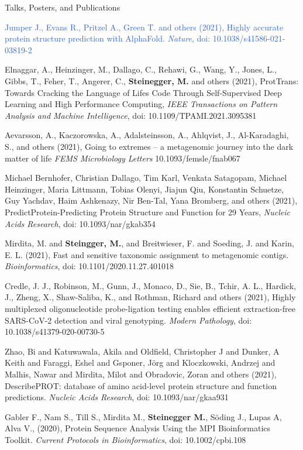 \documentclass{resume} %
\begin{document}
\begin{rSection}{Talks, Posters, and Publications}
\begin{thebibliography}{10}
\textcolor{highlight}{
Jumper J., Evans R., Pritzel A., Green T. and others (2021), 
Highly accurate protein structure prediction with AlphaFold. {\em Nature}, doi: 10.1038/s41586-021-03819-2
}

Elnaggar, A., Heinzinger, M., Dallago, C., Rehawi, G., Wang, Y., Jones, L., Gibbs, T., Feher, T., Angerer, C., {\bf Steinegger, M.} and others (2021), 
ProtTrans: Towards Cracking the Language of Lifes Code Through Self-Supervised Deep Learning and High Performance Computing, {\em IEEE Transactions on Pattern Analysis and Machine Intelligence}, doi: 10.1109/TPAMI.2021.3095381

Aevarsson, A., Kaczorowska, A., Adalsteinsson, A., Ahlqvist, J., Al-Karadaghi, S., and others (2021), 
Going to extremes – a metagenomic journey into the dark matter of life {\em FEMS Microbiology Letters} 10.1093/femsle/fnab067

Michael Bernhofer, Christian Dallago, Tim Karl, Venkata Satagopam, Michael Heinzinger, Maria Littmann, Tobias Olenyi, Jiajun Qiu, Konstantin Schuetze, Guy Yachdav, Haim Ashkenazy, Nir Ben-Tal, Yana Bromberg, and others (2021), PredictProtein-Predicting Protein Structure and Function for 29 Years, {\em Nucleic Acids Research}, doi: 10.1093/nar/gkab354

Mirdita, M. and  {\bf Steingger, M.}, and Breitwieser, F. and Soeding, J. and Karin, E. L. (2021), 
Fast and sensitive taxonomic assignment to metagenomic contigs. {\em Bioinformatics}, doi:  10.1101/2020.11.27.401018

Credle, J. J., Robinson, M., Gunn, J., Monaco, D., Sie, B., Tchir, A. L., Hardick, J., Zheng, X., Shaw-Saliba, K., and Rothman, Richard and others (2021), 
Highly multiplexed oligonucleotide probe-ligation testing enables efficient extraction-free SARS-CoV-2 detection and viral genotyping. {\em Modern Pathology}, doi: 10.1038/s41379-020-00730-5

Zhao, Bi and Katuwawala, Akila and Oldfield, Christopher J and Dunker, A Keith and Faraggi, Eshel and Gsponer, J{\"o}rg and Kloczkowski, Andrzej and Malhis, Nawar and Mirdita, Milot and Obradovic, Zoran and others (2021), DescribePROT: database of amino acid-level protein structure and function predictions. {\em Nucleic Acids Research}, doi: 10.1093/nar/gkaa931

Gabler F., Nam S., Till S., Mirdita M., {\bf Steinegger M.}, Söding J., Lupas A, Alva V., (2020), Protein Sequence Analysis Using the MPI Bioinformatics Toolkit.  {\em Current Protocols in Bioinformatics}, doi: 10.1002/cpbi.108


\end{thebibliography}
\end{rSection}
\end{document}
